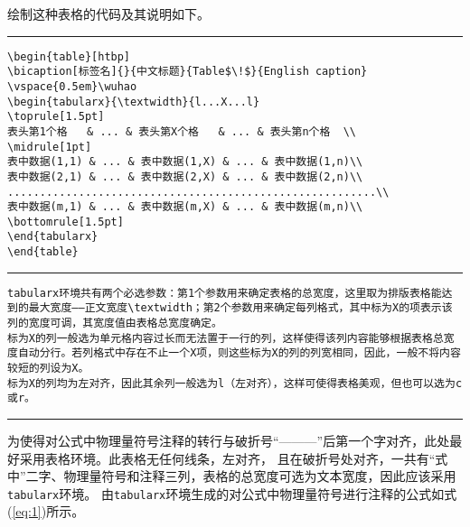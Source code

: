 绘制这种表格的代码及其说明如下。
\vspace{1em}\noindent\hrule
\begin{verbatim}
\begin{table}[htbp]
\bicaption[标签名]{}{中文标题}{Table$\!$}{English caption}
\vspace{0.5em}\wuhao
\begin{tabularx}{\textwidth}{l...X...l}
\toprule[1.5pt]
表头第1个格   & ... & 表头第X个格   & ... & 表头第n个格  \\
\midrule[1pt]
表中数据(1,1) & ... & 表中数据(1,X) & ... & 表中数据(1,n)\\
表中数据(2,1) & ... & 表中数据(2,X) & ... & 表中数据(2,n)\\
.........................................................\\
表中数据(m,1) & ... & 表中数据(m,X) & ... & 表中数据(m,n)\\
\bottomrule[1.5pt]
\end{tabularx}
\end{table}
\end{verbatim}
\noindent\hrule
\begin{verbatim}
tabularx环境共有两个必选参数：第1个参数用来确定表格的总宽度，这里取为排版表格能达到的最大宽度——正文宽度\textwidth；第2个参数用来确定每列格式，其中标为X的项表示该列的宽度可调，其宽度值由表格总宽度确定。
标为X的列一般选为单元格内容过长而无法置于一行的列，这样使得该列内容能够根据表格总宽度自动分行。若列格式中存在不止一个X项，则这些标为X的列的列宽相同，因此，一般不将内容较短的列设为X。
标为X的列均为左对齐，因此其余列一般选为l（左对齐），这样可使得表格美观，但也可以选为c或r。
\end{verbatim}
\noindent\hrule


为使得对公式中物理量符号注释的转行与破折号“———”后第一个字对齐，此处最好采用表格环境。此表格无任何线条，左对齐，
且在破折号处对齐，一共有“式中”二字、物理量符号和注释三列，表格的总宽度可选为文本宽度，因此应该采用\verb|tabularx|环境。
由\verb|tabularx|环境生成的对公式中物理量符号进行注释的公式如式(\ref{eq:1})所示。


